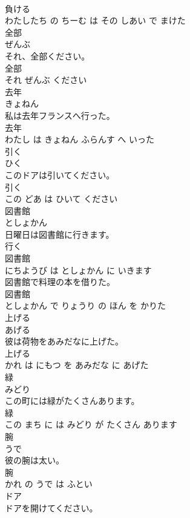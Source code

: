 \documentclass[8pt]{extreport}
\begin{document}
\begin{CJK}{UTF8}{min}
\\	負ける 
\\	わたしたち の ちーむ は その しあい で まけた			
\\	全部	
\\	ぜんぶ			
\\	それ、全部ください。	
\\	全部 
\\	それ ぜんぶ ください			
\\	去年	
\\	きょねん			
\\	私は去年フランスへ行った。	
\\	去年 
\\	わたし は きょねん ふらんす へ いった			
\\	引く	
\\	ひく			
\\	このドアは引いてください。	
\\	引く 
\\	この どあ は ひいて ください			
\\	図書館	
\\	としょかん			
\\	日曜日は図書館に行きます。	
\\	行く 
\\	図書館 
\\	にちようび は としょかん に いきます			
\\	図書館で料理の本を借りた。	
\\	図書館 
\\	としょかん で りょうり の ほん を かりた			
\\	上げる	
\\	あげる			
\\	彼は荷物をあみだなに上げた。	
\\	上げる 
\\	かれ は にもつ を あみだな に あげた			
\\	緑	
\\	みどり			
\\	この町には緑がたくさんあります。	
\\	緑 
\\	この まち に は みどり が たくさん あります			
\\	腕	
\\	うで			
\\	彼の腕は太い。	
\\	腕 
\\	かれ の うで は ふとい			
\\	ドア	
\\	ドアを開けてください。	

\end{CJK}
\end{document}
